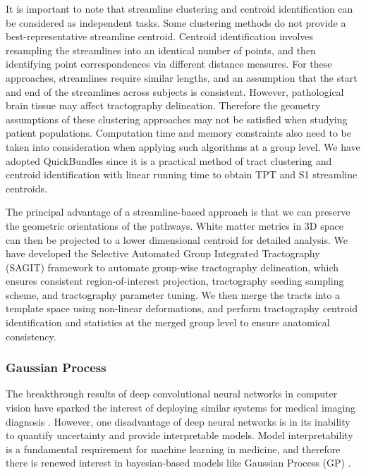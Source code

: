 It is important to note that streamline clustering and centroid identification can be considered as independent tasks. Some clustering methods do not provide a best-representative streamline centroid. Centroid identification involves resampling the streamlines into an identical number of points, and then identifying point correspondences via different distance measures. For these approaches, streamlines require similar lengths, and an assumption that the start and end of the streamlines across subjects is consistent. However, pathological brain tissue may  affect tractography delineation. Therefore the geometry assumptions of these clustering approaches may not be satisfied when studying patient populations. Computation time and memory constraints also need to be taken into consideration when applying such algorithms at a group level. We have adopted QuickBundles since it is a practical method of tract clustering and centroid identification with linear running time to obtain TPT and S1 streamline centroids. \cite{Garyfallidis2012}

The principal advantage of a streamline-based approach is that we can preserve the geometric orientations of the pathways. White matter metrics in 3D space can then be projected to a lower dimensional centroid for detailed analysis. We have developed the Selective Automated Group Integrated Tractography (SAGIT) framework \cite{Chen2016} to automate group-wise tractography delineation, which ensures consistent region-of-interest projection, tractography seeding sampling scheme, and tractography parameter tuning. We then merge the tracts into a template space using non-linear deformations, and perform tractography centroid identification and statistics at the merged group level to ensure anatomical consistency. 

\subsubsection{Gaussian Process}
The breakthrough results of deep convolutional neural networks in computer vision \cite{Krizhevsky2012} have sparked the interest of deploying similar systems for medical imaging diagnosis \cite{Greenspan2016}. However, one disadvantage of deep neural networks is in its inability to quantify uncertainty and provide interpretable models. Model interpretability is a fundamental requirement for machine learning in medicine, and therefore there is renewed interest in bayesian-based models like Gaussian Process (GP) \cite{gal2016dropout}.

